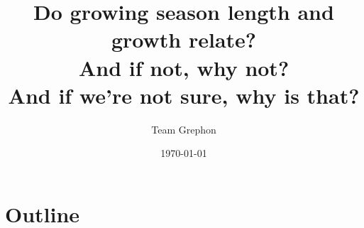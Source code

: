 \documentclass[11pt,letter]{article}
\begin{document}

\renewcommand{\refname}{\CHead{}}

\title{Do growing season length and growth relate? \\ And if not, why not? \\ And if we're not sure, why is that?}
\author{Team Grephon}
\date{\today}
\maketitle

\tableofcontents

\newpage
\section{Outline}

\end{document}
